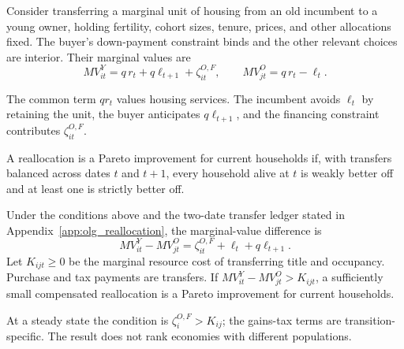 Consider transferring a marginal unit of housing from an old incumbent to a
young owner, holding fertility, cohort sizes, tenure, prices, and other
allocations fixed.  The buyer's down-payment constraint binds and the other
relevant choices are interior.  Their marginal values are
\begin{equation}
 MV_{it}^Y=q\,r_t+q\ell_{t+1}+\zeta_{it}^{O,F},
 \qquad
 MV_{jt}^O=q\,r_t-\ell_t.
 \label{eq:olg_marginal_values}
\end{equation}

The common term $q r_t$ values housing services.  The incumbent avoids
$\ell_t$ by retaining the unit, the buyer anticipates $q\ell_{t+1}$, and the
financing constraint contributes $\zeta_{it}^{O,F}$.

A reallocation is a Pareto improvement for current households if, with
transfers balanced across dates $t$ and $t+1$, every household alive at $t$ is
weakly better off and at least one is strictly better off.

\begin{proposition}
\label{prop:olg_reallocation}
Under the conditions above and the two-date transfer ledger stated in
Appendix~\ref{app:olg_reallocation}, the marginal-value difference is
\begin{equation}
 MV_{it}^Y-MV_{jt}^O
 =\zeta_{it}^{O,F}+\ell_t+q\ell_{t+1}.
 \label{eq:olg_reallocation_surplus}
\end{equation}
Let $K_{ijt}\geq0$ be the marginal resource cost of transferring title and
occupancy.  Purchase and tax payments are transfers.  If
$MV_{it}^Y-MV_{jt}^O>K_{ijt}$, a sufficiently small compensated reallocation
is a Pareto improvement for current households.
\end{proposition}

At a steady state the condition is $\zeta_i^{O,F}>K_{ij}$; the gains-tax terms
are transition-specific.  The result does not rank economies with different
populations.
